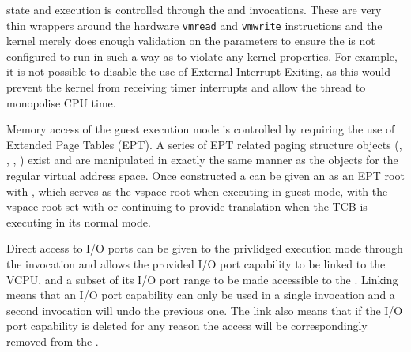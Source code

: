  state and execution is controlled through the 
and  invocations.
These are very thin wrappers around the hardware \texttt{vmread} and \texttt{vmwrite} instructions and the kernel
merely does enough validation on the parameters to ensure the  is not configured
to run in such a way as to violate any kernel properties. For example, it is not possible to
disable the use of External Interrupt Exiting, as this would prevent the kernel from receiving
timer interrupts and allow the thread to monopolise CPU time.

Memory access of the guest execution mode is controlled by requiring the use of Extended
Page Tables (EPT). A series of EPT related paging structure objects (, , , )
exist and are manipulated in exactly the same manner as the objects for the regular virtual
address space. Once constructed a  can be given an  as an EPT root with ,
which serves as the vspace root when executing in guest mode, with the vspace root set
with  or 
continuing to provide translation when the TCB is executing in its normal mode.

Direct access to I/O ports can be given to the privlidged execution mode through the
 invocation and allows the provided I/O port capability to be
linked to the VCPU, and a subset of its I/O port range to be made accessible to the .
Linking means that an I/O port capability can only be used in a single 
invocation and a second invocation will undo the previous one. The link also means that
if the I/O port capability is deleted for any reason the access will be correspondingly removed
from the .
